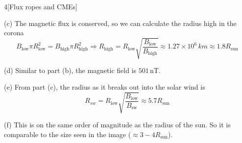 \documentclass[12pt]{article}
\begin{document}
\begin{problem}{4}[Flux ropes and CMEs]
\begin{solution}
(c) The magnetic flux is conserved, so we can calculate the radius high in the
corona
\begin{equation}
    B_{\text{low}}\pi R_{\text{low}}^2=B_{\text{high}}\pi R_{\text{high}}^2
    \Rightarrow
    R_{\text{high}}=R_{\text{low}}\sqrt{\frac{B_{\text{low}}}{B_{\text{high}}}}
    \approx1.27\times 10^6\,\si{km}
    \approx 1.8R_{\text{sun}}
\end{equation}

(d) Similar to part (b), the magnetic field is $501$\,\si{nT}.

(e) From part (c), the radius as it breaks out into the solar wind is
\begin{equation}
    R_{sw}=R_{\text{low}} \sqrt{\frac{B_{\text{low}}}{B_{\text{sw}}}}
    \approx 5.7R_{\text{sun}}
\end{equation}

(f) This is on the same order of magnitude as the radius of the sun. So it is
comparable to the size seen in the image ($\approx 3-4 R_{\text{sun}}$).
\end{solution}
\end{problem}
\end{document}
